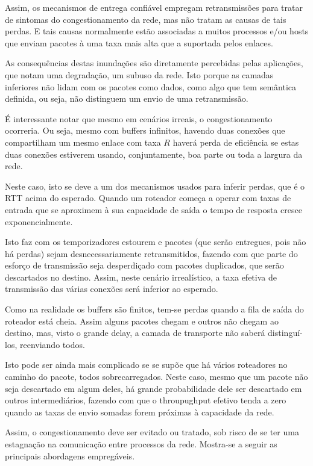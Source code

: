 Assim, os mecanismos de entrega confiável empregam retransmissões para tratar de sintomas do congestionamento da rede, 
mas não tratam as causas de tais perdas.
E tais causas normalmente estão associadas a muitos processos e/ou hosts que enviam pacotes à uma taxa mais alta que a suportada pelos enlaces.

As consequências destas inundações são diretamente percebidas pelas aplicações, que notam uma degradação, um subuso da rede.
Isto porque as camadas inferiores não lidam com os pacotes como dados, como algo que tem semântica definida, ou seja, não distinguem um envio de uma retransmissão.

É interessante notar que mesmo em cenários irreais, o congestionamento ocorreria. 
Ou seja, mesmo com buffers infinitos, havendo duas conexões que compartilham um mesmo enlace com taxa $R$ haverá perda de eficiência se estas duas conexões estiverem usando, conjuntamente, boa parte ou toda a largura da rede.

Neste caso, isto se deve a um dos mecanismos usados para inferir perdas, que é o RTT acima do esperado.
Quando um roteador começa a operar com taxas de entrada que se aproximem à sua capacidade de saída o tempo de resposta cresce exponencialmente.

Isto faz com os temporizadores estourem e pacotes (que serão entregues, pois não há perdas) sejam desnecessariamente retransmitidos, fazendo com que parte do esforço de transmissão seja desperdiçado com pacotes duplicados, que serão descartados no destino.
Assim, neste cenário irrealístico, a taxa efetiva de transmissão das várias conexões será inferior ao esperado.

Como na realidade os buffers são finitos, tem-se perdas quando a fila de saída do roteador está cheia.
Assim alguns pacotes chegam e outros não chegam ao destino, mas, visto o grande delay, a camada de transporte não saberá distinguí-los, reenviando todos.

Isto pode ser ainda mais complicado se se supõe que há vários roteadores no caminho do pacote, todos sobrecarregados.
Neste caso, mesmo que um pacote não seja descartado em algum deles, há grande probabilidade dele ser descartado em outros intermediários,
fazendo com que o throupughput efetivo tenda a zero quando as taxas de envio somadas forem próximas à capacidade da rede.

Assim, o congestionamento deve ser evitado ou tratado, sob risco de se ter uma estagnação na comunicação entre processos da rede.
Mostra-se a seguir as principais abordagens empregáveis.

